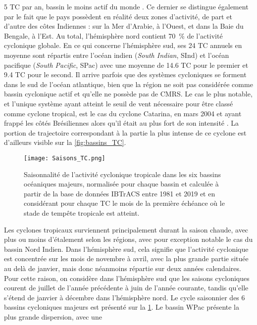 \documentclass[../main.tex]{subfiles}
\begin{document}
\num{5} TC par an, bassin le moins actif du monde \parencite{gray_global_1968,lander_look_1998,schreck_impact_2014}. Ce dernier se distingue également par le
fait que le pays possèdent en réalité deux zones d'activité, de part et d'autre des côtes Indiennes : sur la Mer d'Arabie, à l'Ouest, et dans la Baie du
Bengale, à l'Est. Au total, l'hémisphère nord contient \SI{70}{\percent} de l'activité cyclonique globale. En ce qui concerne l'hémisphère sud, ses \num{24} TC
annuels en moyenne sont répartis entre l'océan indien (\textit{South Indian}, SInd) et l'océan pacifique (\textit{South Pacific}, SPac) avec une moyenne de
\num{14.6} TC pour le premier et \num{9.4} TC pour le second. Il arrive parfois que des systèmes cycloniques se forment dans le sud de l'océan atlantique, bien
que la région ne soit pas considérée comme bassin cyclonique actif et qu'elle ne possède pas de CMRS. Le cas le plus notable, et l'unique système ayant atteint
le seuil de vent nécessaire pour être classé comme cyclone tropical, est le cas du cyclone Catarina, en mars 2004 et ayant frappé les côtés Brésiliennes alors
qu'il était au plus fort de son intensité \parencite{mctaggart-cowan_analysis_2006}. La portion de trajectoire correspondant à la partie la plus intense de ce
cyclone est d'ailleurs visible sur la \cref{fig:bassins_TC}.
%
\begin{figure}[t]
    \centering
    \texttt{[image: Saisons\_TC.png]}
    \caption{Saisonnalité de l'activité cyclonique tropicale dans les six bassins océaniques majeurs, normalisée pour chaque bassin et calculée à partir de la
    base de données IBTrACS entre 1981 et 2019 et en considérant pour chaque TC le mois de la première échéance où le stade de tempête tropicale est atteint.}
    \label{fig:saisons_TC}
\end{figure}
%
Les cyclones tropicaux surviennent principalement durant la saison chaude, avec plus ou moins d'étalement selon les régions, avec pour exception notable le cas
du bassin Nord Indien. Dans l'hémisphère sud, cela signifie que l'activité cyclonique est concentrée sur les mois de novembre à avril, avec la plus grande
partie située au delà de janvier, mais donc néanmoins répartie sur deux années calendaires. Pour cette raison, on considère dans l'hémisphère sud que les
saisons cycloniques courent de juillet de l'année précédente à juin de l'année courante, tandis qu'elle s'étend de janvier à décembre dans l'hémisphère nord. Le
cycle saisonnier des \num{6} bassins cycloniques majeurs est présenté sur la \cref{fig:saisons_TC}. Le bassin WPac présente la plus grande dispersion, avec une
\end{document}
